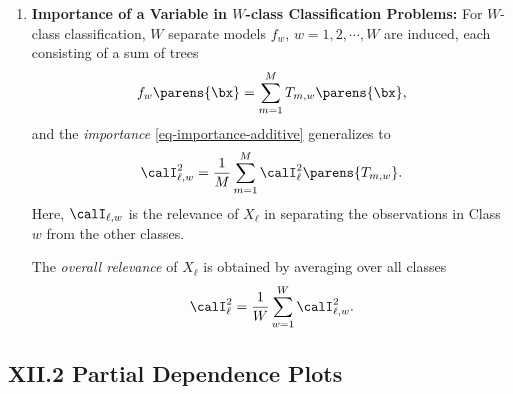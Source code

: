 \documentclass[12pt]{article}
\begin{document}
\begin{enumerate}[label=\textbf{\arabic*.}]
	\item \textbf{Importance of a Variable in $W$-class Classification Problems:} For $W$-class classification, $W$ separate models $f_w$, $w = 1, 2, \cdots, W$ are induced, each consisting of a sum of trees
	\begin{align*}
		f_w \parens{\bx} = \sum_{m=1}^M T_{m,w} \parens{\bx}, 
	\end{align*}
	and the \textit{importance} \eqref{eq-importance-additive} generalizes to 
	\begin{align}\label{var.imp.kl}
		\calI_{\ell, w}^2 = \frac{1}{M} \sum_{m=1}^M \calI_{\ell}^2 \parens{T_{m, w}}. 
	\end{align}
	Here, $\calI_{\ell, w}$ is the relevance of $X_{\ell}$ in separating the observations in Class $w$ from the other classes. 
	
	The \textit{overall relevance} of $X_{\ell}$ is obtained by averaging over all classes 
	\begin{align*}
		\calI_{\ell}^2 = \frac{1}{W} \sum_{w=1}^W \calI_{\ell , w}^2. 
	\end{align*}

\end{enumerate}


\subsection*{XII.2 Partial Dependence Plots}
\end{document}
